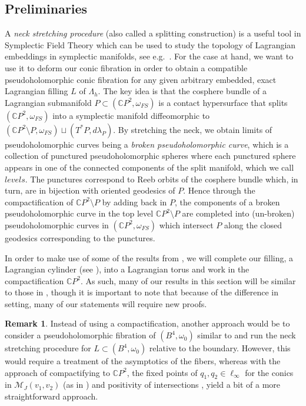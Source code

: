\documentclass[10pt]{amsart}
\theoremstyle{plain}
\theoremstyle{definition}
\newtheorem{remark}[thm]{Remark}
\numberwithin{equation}{section}
\newcommand{\C}{\mathbb{C}}
\newcommand{\La}{\Lambda}
\newcommand{\sse}{\subset}
\newcommand{\sm}{\setminus}
\begin{document}
\subsection{Preliminaries}\label{sec:prelim} A \textit{neck stretching procedure} (also called a splitting construction) is a useful tool in Symplectic Field Theory which can be used to study the topology of Lagrangian embeddings in symplectic manifolds, see e.g.~\cite{MR3157146,EGH00_SFT}. For the case at hand, we want to use it to deform our conic fibration in order to obtain a compatible pseudoholomorphic conic fibration for any given arbitrary embedded, exact Lagrangian filling $L$ of $\La_h$. The key idea is that the cosphere bundle of a Lagrangian submanifold $P\sse (\C P^2,\omega_{FS})$ is a contact hypersurface that splits $(\C P^2,\omega_{FS})$ into a symplectic manifold diffeomorphic to $(\C P^2\sm P,\omega_{FS})\sqcup (T^*P,d\lambda_{P})$. By stretching the neck, we obtain limits of pseudoholomorphic curves being a \textit{broken pseudoholomorphic curve}, which is a collection of punctured pseudoholomorphic spheres where each punctured sphere appears in one of the connected components of the split manifold, which we call $\textit{levels}$. The punctures correspond to Reeb orbits of the cosphere bundle which, in turn, are in bijection with oriented geodesics of $P$. Hence through the compactification of $\C P^2\sm P$ by adding back in $P$, the components of a broken pseudoholomorphic curve in the top level $\C P^2\sm P$ are completed into (un-broken) pseudoholomorphic curves in $(\C P^2,\omega_{FS})$ which intersect $P$ along the closed geodesics corresponding to the punctures.

In order to make use of some of the results from \cite{DR19_WhitneySphere}, we will complete our filling, a Lagrangian cylinder (see ), into a Lagrangian torus and work in the compactification $\C P^2$. As such, many of our results in this section will be similar to those in \cite[Section 5]{DR19_WhitneySphere}, though it is important to note that because of the difference in setting, many of our statements will require new proofs.

\begin{remark}
Instead of using a compactification, another approach would be to consider a pseudoholomorphic fibration of $(B^4,\omega_0)$ similar to  and run the neck stretching procedure for $L\sse (B^4,\omega_0)$ relative to the boundary. However, this would require a treatment of the asymptotics of the fibers, whereas with the approach of compactifying to $\C P^2$, the fixed points of $q_1,q_2\in \ell_\infty$ for the conics in $\mathcal{M}_J(v_1,v_2)$ (as in ) and positivity of intersections \cite{McDuff91_Pos_of_int}, yield a bit of a more straightforward approach.
\end{remark}
\end{document}
